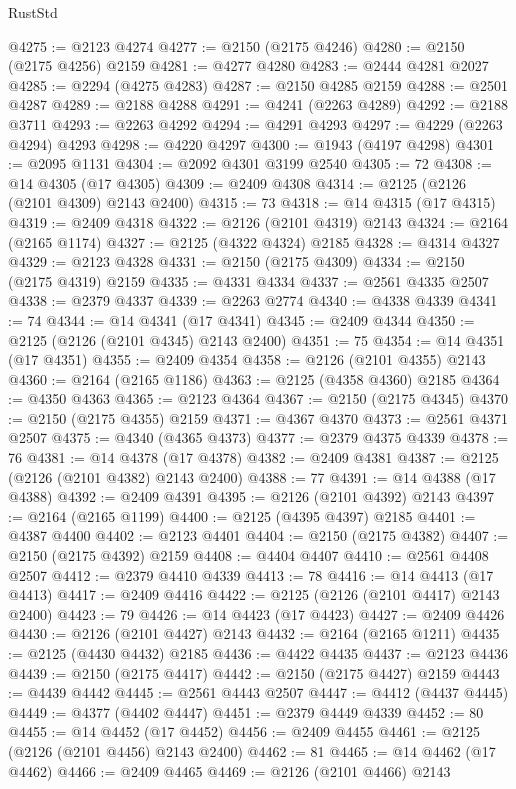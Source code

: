 \begin{lexlean}{RustStd}
\begin{coremodule}
@4275 := @2123 @4274
@4277 := @2150 (@2175 @4246)
@4280 := @2150 (@2175 @4256) @2159
@4281 := @4277 @4280
@4283 := @2444 @4281 @2027
@4285 := @2294 (@4275 @4283)
@4287 := @2150 @4285 @2159
@4288 := @2501 @4287
@4289 := @2188 @4288
@4291 := @4241 (@2263 @4289)
@4292 := @2188 @3711
@4293 := @2263 @4292
@4294 := @4291 @4293
@4297 := @4229 (@2263 @4294) @4293
@4298 := @4220 @4297
@4300 := @1943 (@4197 @4298)
@4301 := @2095 @1131
@4304 := @2092 @4301 @3199 @2540
@4305 := 72
@4308 := @14 @4305 (@17 @4305)
@4309 := @2409 @4308
@4314 := @2125 (@2126 (@2101 @4309) @2143 @2400)
@4315 := 73
@4318 := @14 @4315 (@17 @4315)
@4319 := @2409 @4318
@4322 := @2126 (@2101 @4319) @2143
@4324 := @2164 (@2165 @1174)
@4327 := @2125 (@4322 @4324) @2185
@4328 := @4314 @4327
@4329 := @2123 @4328
@4331 := @2150 (@2175 @4309)
@4334 := @2150 (@2175 @4319) @2159
@4335 := @4331 @4334
@4337 := @2561 @4335 @2507
@4338 := @2379 @4337
@4339 := @2263 @2774
@4340 := @4338 @4339
@4341 := 74
@4344 := @14 @4341 (@17 @4341)
@4345 := @2409 @4344
@4350 := @2125 (@2126 (@2101 @4345) @2143 @2400)
@4351 := 75
@4354 := @14 @4351 (@17 @4351)
@4355 := @2409 @4354
@4358 := @2126 (@2101 @4355) @2143
@4360 := @2164 (@2165 @1186)
@4363 := @2125 (@4358 @4360) @2185
@4364 := @4350 @4363
@4365 := @2123 @4364
@4367 := @2150 (@2175 @4345)
@4370 := @2150 (@2175 @4355) @2159
@4371 := @4367 @4370
@4373 := @2561 @4371 @2507
@4375 := @4340 (@4365 @4373)
@4377 := @2379 @4375 @4339
@4378 := 76
@4381 := @14 @4378 (@17 @4378)
@4382 := @2409 @4381
@4387 := @2125 (@2126 (@2101 @4382) @2143 @2400)
@4388 := 77
@4391 := @14 @4388 (@17 @4388)
@4392 := @2409 @4391
@4395 := @2126 (@2101 @4392) @2143
@4397 := @2164 (@2165 @1199)
@4400 := @2125 (@4395 @4397) @2185
@4401 := @4387 @4400
@4402 := @2123 @4401
@4404 := @2150 (@2175 @4382)
@4407 := @2150 (@2175 @4392) @2159
@4408 := @4404 @4407
@4410 := @2561 @4408 @2507
@4412 := @2379 @4410 @4339
@4413 := 78
@4416 := @14 @4413 (@17 @4413)
@4417 := @2409 @4416
@4422 := @2125 (@2126 (@2101 @4417) @2143 @2400)
@4423 := 79
@4426 := @14 @4423 (@17 @4423)
@4427 := @2409 @4426
@4430 := @2126 (@2101 @4427) @2143
@4432 := @2164 (@2165 @1211)
@4435 := @2125 (@4430 @4432) @2185
@4436 := @4422 @4435
@4437 := @2123 @4436
@4439 := @2150 (@2175 @4417)
@4442 := @2150 (@2175 @4427) @2159
@4443 := @4439 @4442
@4445 := @2561 @4443 @2507
@4447 := @4412 (@4437 @4445)
@4449 := @4377 (@4402 @4447)
@4451 := @2379 @4449 @4339
@4452 := 80
@4455 := @14 @4452 (@17 @4452)
@4456 := @2409 @4455
@4461 := @2125 (@2126 (@2101 @4456) @2143 @2400)
@4462 := 81
@4465 := @14 @4462 (@17 @4462)
@4466 := @2409 @4465
@4469 := @2126 (@2101 @4466) @2143

\end{coremodule}
\end{lexlean}
